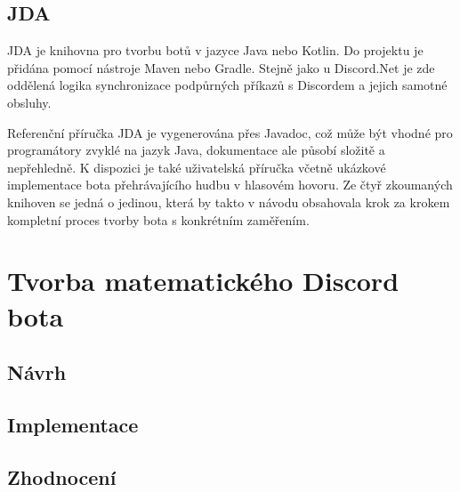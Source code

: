 \documentclass[FM]{tulthesis}
\begin{document}
	\section{JDA}
	
	JDA je knihovna pro tvorbu botů v jazyce Java nebo Kotlin. Do projektu je přidána pomocí nástroje Maven nebo Gradle. Stejně jako u Discord.Net je zde oddělená logika synchronizace podpůrných příkazů s Discordem a jejich samotné obsluhy.
	
	Referenční příručka JDA je vygenerována přes Javadoc, což může být vhodné pro programátory zvyklé na jazyk Java, dokumentace ale působí složitě a nepřehledně. K dispozici je také uživatelská příručka včetně ukázkové implementace bota přehrávajícího hudbu v hlasovém hovoru. Ze čtyř zkoumaných knihoven se jedná o jedinou, která by takto v návodu obsahovala krok za krokem kompletní proces tvorby bota s konkrétním zaměřením.
	
	\chapter{Tvorba matematického Discord bota}
	
	
	\section{Návrh}
	 
	
	\section{Implementace}
	
	
	\section{Zhodnocení}
	
	
\end{document}
